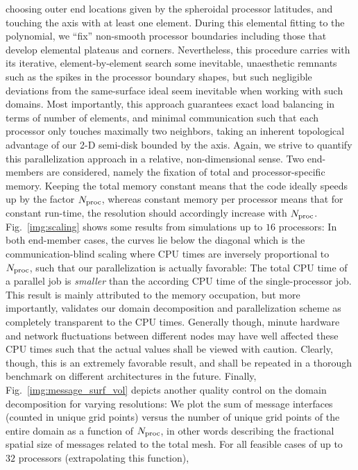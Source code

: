 choosing outer end locations given by the
spheroidal processor latitudes, and touching the axis with at least one
element. During this elemental fitting to the polynomial,
we ``fix'' non-smooth processor boundaries including those that
develop elemental plateaus and corners.
%
Nevertheless, this procedure carries with its iterative, element-by-element
search some inevitable, unaesthetic remnants such as the spikes in the processor
boundary shapes, but such negligible deviations from the same-surface ideal
seem inevitable when working with such domains.
Most importantly, this approach guarantees exact load balancing in terms of
number of elements, and minimal communication such that each processor only
touches maximally two neighbors, taking an inherent topological
advantage of our 2-D semi-disk bounded by the axis.
%
%
Again, we strive to quantify this parallelization approach in a
relative, non-dimensional sense. Two end-members are considered,
namely the fixation of total and processor-specific memory.
Keeping the total memory constant means that the code ideally speeds up
by the factor $N_{\rm proc}$, whereas constant memory per processor means
that for constant run-time, the resolution should accordingly
increase with $N_{\rm proc}$. Fig.~\ref{img:scaling} shows some results from
simulations up to $16$ processors: In both end-member cases, the curves lie
below the diagonal which is the communication-blind scaling where CPU times
are inversely proportional to $N_{\rm proc}$, such that our parallelization is
actually favorable: The total CPU time of a parallel job is \textit{smaller} than
the according CPU time of the single-processor job. This result is mainly attributed
to the memory occupation, but more importantly, validates our domain decomposition
and parallelization scheme as completely transparent to the CPU times. Generally though,
minute hardware and network fluctuations between different nodes may have well affected
these CPU times such that the actual values shall be viewed with caution. Clearly, though,
this is an extremely favorable result, and shall be repeated in a thorough benchmark
on different architectures in the future.
%
Finally, Fig.~\ref{img:message_surf_vol} depicts another quality control on the
domain decomposition for varying resolutions: We plot the sum of message
interfaces (counted in unique grid points) versus the number of unique grid
points of the entire domain as a function of $N_{\rm proc}$, in other
words describing the fractional spatial size of messages related to the total mesh.
For all feasible cases of up to $32$ processors (extrapolating this function),
